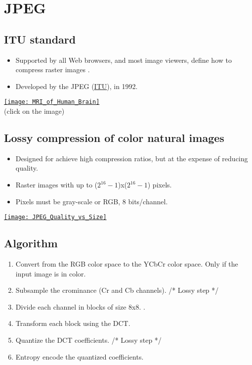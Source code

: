 \chapter{\gls{JPEG}}

\section{\gls{ITU} standard}
\begin{itemize}
\item Supported by all Web browsers, and most image viewers, define
  how to compress raster images \cite{ccitt.t81}.
\item Developed by the \gls{JPEG} (\href{https://www.itu.int}{ITU}),
  in 1992.
\end{itemize}
\vspace{-2ex}
\begin{center}
  \href{https://en.wikipedia.org/wiki/Magnetic_resonance_imaging_of_the_brain#/media/File:MRI_of_Human_Brain.jpg}{\texttt{[image: MRI\_of\_Human\_Brain]}}\\
  (click on the image)
\end{center}

\section{Lossy compression of color natural images}
\begin{itemize}
\item Designed for achieve high compression ratios, but at the expense of reducing quality.
  \item Raster images with up to ($2^{16}-1$)x($2^{16}-1$) pixels.
  \item Pixels must be gray-scale or \gls{RGB}, 8 bits/channel.
\end{itemize}
\vspace{-2ex}
\begin{center}
  \href{https://www.thewebmaster.com/jpeg-definitive-guide/}{\texttt{[image: JPEG\_Quality\_vs\_Size]}}
\end{center}

\section{Algorithm}
\begin{enumerate}
\item Convert from the \gls{RGB} color space to the \gls{YCbCr} color
  space. Only if the input image is in color.
\item Subsample the crominance (Cr and Cb channels). /* Lossy step */
\item Divide each channel in blocks of size 8x8. .
\item Transform each block using the \gls{DCT}.
\item Quantize the \gls{DCT} coefficients. /* Lossy step */
\item Entropy encode the quantized coefficients.
\end{enumerate}

